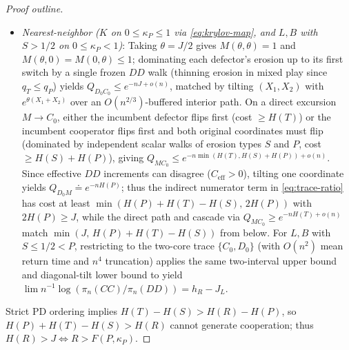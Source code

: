 \documentclass[11pt,reqno]{amsart}
\theoremstyle{definition}
\theoremstyle{remark}
\begin{document}
\begin{proof}[Proof outline]
\begin{itemize}
  \item \emph{Nearest-neighbor ($K$ on $0 \le \kappa_P \le 1$ via \eqref{eq:krylov-map}, and $L, B$ with $S > 1/2$ on $0 \le \kappa_P < 1$)}: Taking $\theta = J/2$ gives $M(\theta,\theta) = 1$ and $M(\theta,0) = M(0,\theta) \le 1$; dominating each defector's erosion up to its first switch by a single frozen $DD$ walk (thinning erosion in mixed play since $q_T \le q_P$) yields $Q_{D_0 C_0} \le e^{-n J + o(n)}$, matched by tilting $(X_1,X_2)$ with $e^{\theta(X_1+X_2)}$ over an $O(n^{2/3})$-buffered interior path. On a direct excursion $M \to C_0$, either the incumbent defector flips first (cost $\ge H(T)$) or the incumbent cooperator flips first and both original coordinates must flip (dominated by independent scalar walks of erosion types $S$ and $P$, cost $\ge H(S)+H(P)$), giving $Q_{MC_0} \le e^{-n\min(H(T), H(S)+H(P)) + o(n)}$. Since effective $DD$ increments can disagree ($C_{\mathrm{eff}} > 0$), tilting one coordinate yields $Q_{D_0 M} \doteq e^{-n H(P)}$; thus the indirect numerator term in \eqref{eq:trace-ratio} has cost at least $\min(H(P)+H(T)-H(S),\, 2H(P))$ with $2H(P) \ge J$, while the direct path and cascade via $Q_{MC_0} \ge e^{-n H(T)+o(n)}$ match $\min(J,\, H(P)+H(T)-H(S))$ from below. For $L, B$ with $S \le 1/2 < P$, restricting to the two-core trace $\{C_0, D_0\}$ (with $O(n^2)$ mean return time and $n^4$ truncation) applies the same two-interval upper bound and diagonal-tilt lower bound to yield $\lim n^{-1}\log(\pi_n(CC)/\pi_n(DD)) = h_R - J_L$.
\end{itemize}
Strict PD ordering implies $H(T)-H(S) > H(R)-H(P)$, so $H(P)+H(T)-H(S) > H(R)$ cannot generate cooperation; thus $H(R) > J \iff R > F(P,\kappa_P)$.


\end{proof}
\end{document}
